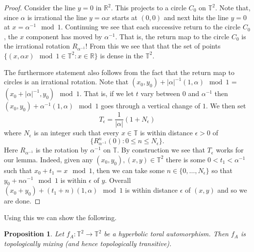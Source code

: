 \documentclass[12pt]{article}
\newtheorem{proposition}[theorem]{Proposition}
\theoremstyle{definition}
\theoremstyle{remark}
\begin{document}
\begin{proof}
Consider the line $y =0$ in $\mathbb{R}^2$. This projects to a circle $C_0$ on $\mathbb{T}^2$. Note that, since $\alpha$ is irrational the line $y = \alpha x$ starts at $(0,0)$ and next hits the line $y =0$ at $x = \alpha^{-1} \mod 1$. Continuing we see that each successive return to the circle  $C_0$, the $x$ component has moved by $\alpha^{-1}$. That is, the return map to the circle $C_0$ is the irrational rotation $R_{\alpha^{-1}}$! From this we see that that the  set of points $\{(x,\alpha x) \mod 1 \in \mathbb{T}^2 : x \in \mathbb{R}\}$ is dense in the $\mathbb{T}^2$.

The furthermore statement also follows from the fact that the return map to circles is an irrational rotation. 
Note that $(x_0, y_0) + |\alpha|^{-1}(1,\alpha) \mod 1$ = $(x_0+ |\alpha|^{-1}, y_0) \mod 1$. That is, if we let $t$ vary between $0$ and $\alpha^{-1}$ then $(x_0, y_0) + \alpha^{-1}(1,\alpha) \mod 1$ goes through a vertical change of $1$. We then set
\[
T_\epsilon = \frac{1}{|\alpha|} (1 + N_\epsilon)
\]
where $N_\epsilon$ is an integer such that every $x \in \mathbb{T}$ is within distance $\epsilon >0$ of 
\[
\{ R_{\alpha^{-1}}^n(0) : 0 \le n \le N_\epsilon\}.
\]
Here $R_{\alpha^{-1}}$ is the rotation by $\alpha^{-1}$ on $\mathbb{T}$.
By construction we see that $T_\epsilon$ works for our lemma. Indeed, given any $(x_0,y_0), (x,y) \in \mathbb{T}^2$ there is some $0 < t_1 < \alpha^{-1}$ such that $x_0 + t_1 = x \mod 1$, then we can take some $ n \in \{0,\ldots, N_\epsilon\}$ so that $y_0 + n\alpha^{-1} \mod 1$ is within $\epsilon$ of $y$. Overall $(x_0 + y_0) + (t_1 + n)(1,\alpha) \mod 1$ is within distance $\epsilon$ of $(x,y)$ and so we are done.
\end{proof}

Using this we can show the following.
\begin{proposition}
Let $f_A :\mathbb T^2 \to \mathbb T^2$ be a hyperbolic toral automorphism. Then $f_A$ is topologically mixing
(and hence topologically transitive).
\end{proposition}
\end{document}
